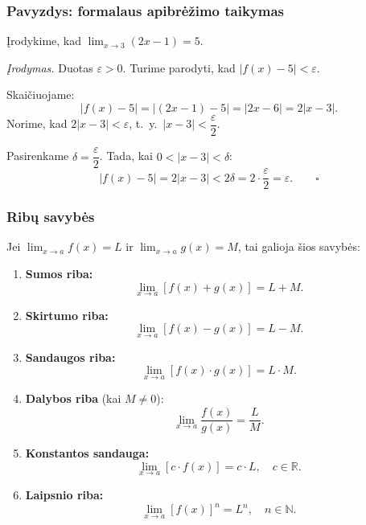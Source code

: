 \subsubsection*{Pavyzdys: formalaus apibrėžimo taikymas}

\begin{example}
Įrodykime, kad $\displaystyle\lim_{x \to 3}(2x - 1) = 5$.

\textit{Įrodymas.} Duotas $\varepsilon > 0$. Turime parodyti, kad $|f(x) - 5| < \varepsilon$.

Skaičiuojame:
\[
    |f(x) - 5| = |(2x - 1) - 5| = |2x - 6| = 2|x - 3|.
\]
Norime, kad $2|x - 3| < \varepsilon$, t.\ y.\ $|x - 3| < \dfrac{\varepsilon}{2}$.

Pasirenkame $\delta = \dfrac{\varepsilon}{2}$. Tada, kai $0 < |x - 3| < \delta$:
\[
    |f(x) - 5| = 2|x - 3| < 2\delta = 2 \cdot \frac{\varepsilon}{2} = \varepsilon. \qquad \square
\]
\end{example}

\subsubsection*{Ribų savybės}

Jei $\displaystyle\lim_{x \to a} f(x) = L$ ir $\displaystyle\lim_{x \to a} g(x) = M$, tai galioja šios savybės:

\begin{tcolorbox}[colback=green!5!white, colframe=green!50!black, title=Ribų aritmetika]
\begin{enumerate}
    \item \textbf{Sumos riba:}
    \[
        \lim_{x \to a} [f(x) + g(x)] = L + M.
    \]
    \item \textbf{Skirtumo riba:}
    \[
        \lim_{x \to a} [f(x) - g(x)] = L - M.
    \]
    \item \textbf{Sandaugos riba:}
    \[
        \lim_{x \to a} [f(x) \cdot g(x)] = L \cdot M.
    \]
    \item \textbf{Dalybos riba} (kai $M \neq 0$):
    \[
        \lim_{x \to a} \frac{f(x)}{g(x)} = \frac{L}{M}.
    \]
    \item \textbf{Konstantos sandauga:}
    \[
        \lim_{x \to a} [c \cdot f(x)] = c \cdot L, \quad c \in \mathbb{R}.
    \]
    \item \textbf{Laipsnio riba:}
    \[
        \lim_{x \to a} [f(x)]^n = L^n, \quad n \in \mathbb{N}.
    \]
\end{enumerate}
\end{tcolorbox}

